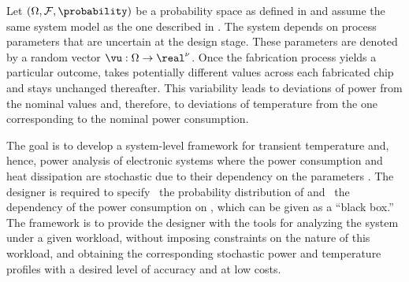 Let $(\Omega, \mathcal{F}, \probability)$ be a probability space as defined in
 and assume the same system model as the one described
in . The system depends on \nu process parameters that are
uncertain at the design stage. These parameters are denoted by a random vector
$\vu: \Omega \to \real^\nu$. Once the fabrication process yields a particular
outcome, \vu takes potentially different values across each fabricated chip and
stays unchanged thereafter. This variability leads to deviations of power from
the nominal values and, therefore, to deviations of temperature from the one
corresponding to the nominal power consumption.

The goal is to develop a system-level framework for transient temperature and,
hence, power analysis of electronic systems where the power consumption and heat
dissipation are stochastic due to their dependency on the parameters \vu. The
designer is required to specify \one~the probability distribution of \vu and
\two~the dependency of the power consumption on \vu, which can be given as a
``black box.'' The framework is to provide the designer with the tools for
analyzing the system under a given workload, without imposing constraints on the
nature of this workload, and obtaining the corresponding stochastic power \mp
and temperature \mq profiles with a desired level of accuracy and at low costs.
